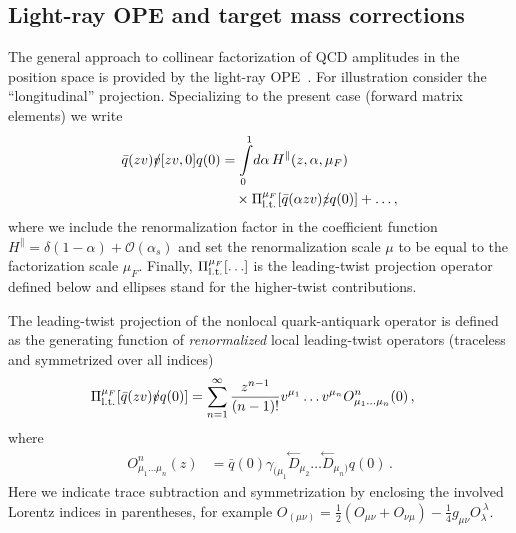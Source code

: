 %
\subsection{Light-ray OPE and target mass corrections}\label{subsect_OPE}%
%

The general approach to collinear factorization of QCD amplitudes in the position space is provided by the light-ray OPE~\cite{Anikin:1978tj,Anikin:1979kq,Balitsky:1987bk,Mueller:1998fv,Balitsky:1990ck,Geyer:1999uq}. For illustration consider the ``longitudinal'' projection. Specializing to the present case (forward matrix elements) we write
\begin{align}
\label{light-ray-OPE}
 \bar q(zv) \slashed{v} [zv,0] q(0) &= \int\limits_0^1\!d\alpha \, H^\parallel(z,\alpha,\mu_F)
\notag\\&\quad \times \Pi_{\rm l.t.}^{\mu_F}[\bar q (\alpha z v) \slashed{z} q(0)] + \ldots,
\end{align} 
where we include the renormalization factor in the coefficient function $H^\parallel = \delta(1-\alpha) + \mathcal{O}(\alpha_s)$ and set 
the renormalization scale $\mu$ to be equal to the factorization scale $\mu_F$. 
Finally,  $\Pi_{\rm l.t.}^{\mu_F}[\ldots]$ is the leading-twist projection operator defined below and
ellipses stand for the higher-twist contributions.

The leading-twist projection of the nonlocal quark-antiquark operator is 
defined as the generating function of \emph{renormalized} 
local leading-twist operators  (traceless and symmetrized over all indices)
\begin{align}
\Pi_{\rm l.t.}^{\mu_F}[\bar q (z v) \slashed{v} q(0)]
&= \sum_{n=1}^\infty \frac{z^{n-1}}{(n-1)!} v^{\mu_1}\ldots v^{\mu_n} O_{\mu_1\ldots\mu_n}^{n}(0)\,,
\label{eq:LTprojector}
\end{align}
where 
\begin{align}
  O_{\mu_1\ldots\mu_n}^{n}(z) &= 
\bar q(0)\gamma_{(\mu_1}\!\!\stackrel{\leftarrow}{D}_{\mu_2}\ldots \!\stackrel{\leftarrow}{D}_{\mu_{n})} q(0)\,.  
\end{align}
%
Here we indicate trace subtraction and symmetrization by enclosing the involved Lorentz indices in parentheses,
for example $O_{(\mu\nu)} = \frac12 (O_{\mu\nu}+ O_{\nu\mu}) - \frac14 g_{\mu\nu} O_{\lambda}^{~\lambda}$.

